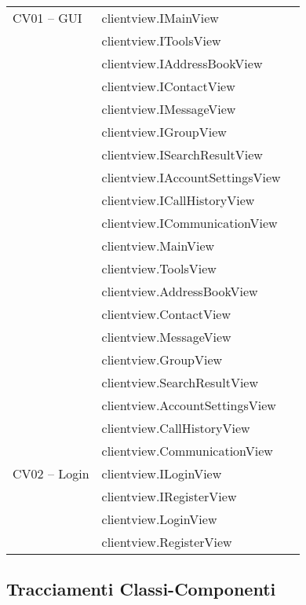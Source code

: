 \begin{center}
\begin{longtable}{lp{}l}
CV01 -- GUI & clientview.IMainView\\
& clientview.IToolsView\\
& clientview.IAddressBookView\\
& clientview.IContactView\\
& clientview.IMessageView\\
& clientview.IGroupView\\
& clientview.ISearchResultView\\
& clientview.IAccountSettingsView\\
& clientview.ICallHistoryView\\
& clientview.ICommunicationView\\
& clientview.MainView\\
& clientview.ToolsView\\
& clientview.AddressBookView\\
& clientview.ContactView\\
& clientview.MessageView\\
& clientview.GroupView\\
& clientview.SearchResultView\\
& clientview.AccountSettingsView\\
& clientview.CallHistoryView\\
& clientview.CommunicationView\\

CV02 -- Login & clientview.ILoginView\\
& clientview.IRegisterView\\
& clientview.LoginView\\
& clientview.RegisterView\\

\bottomrule
\end{longtable}
\end{center}
\subsection{Tracciamenti Classi-Componenti}\label{sec:tracClassComp}

